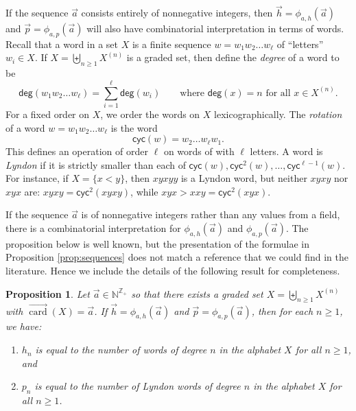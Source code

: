 \documentclass[11pt]{amsart}
\newtheorem{proposition}[theorem]{Proposition}
\theoremstyle{definition}
\numberwithin{equation}{section}
\def\NN{{\mathbb N}}
\def\ZZ{{\mathbb Z}}
\newcommand{\veccard}{\overrightarrow{\operatorname{card}}}
\begin{document}
If the sequence $\vec{a}$ consists entirely of nonnegative integers,
then $\vec{h} = \phi_{a, h}(\vec{a})$ and $\vec{p} = \phi_{a, p}(\vec{a})$ will also have combinatorial interpretation in terms of words.
Recall that a word in a set $X$ is a finite sequence $w = w_{1} w_{2} \ldots w_{\ell}$ of ``letters'' $w_{i} \in X$.  
If $X = \biguplus_{n \geq 1} X^{(n)}$ is a graded set, then define the \emph{degree} of a word to be
\[
\mathsf{deg}(w_1 w_2 \ldots w_{\ell}) = \sum_{i = 1}^{\ell} \mathsf{deg}(w_{i})
\qquad\text{where $\mathsf{deg}(x) = n$ for all $x \in X^{(n)}$}.
\]
For a fixed order on $X$, we order the words on $X$ lexicographically.  
The \emph{rotation} of a word $w = w_{1} w_{2} \ldots w_{\ell}$ is the word
\[
\mathsf{cyc}(w) =  w_{2} \ldots w_{\ell} w_{1}.
\]
This defines an operation of order $\ell$ on words of with $\ell$ letters.  
A word is \emph{Lyndon} if it is strictly smaller than each of $\mathsf{cyc}(w), \mathsf{cyc}^{2}(w), \ldots, \mathsf{cyc}^{\ell-1}(w)$.  
For instance, if $X = \{x < y\}$, then $xyxyy$ is a Lyndon word, but neither $xyxy$ nor $xyx$ are: $xyxy = \mathsf{cyc}^{2}(xyxy)$, while $xyx > xxy = \mathsf{cyc}^{2}(xyx)$.

If the sequence $\vec{a}$ is of nonnegative integers rather than
any values from a field, there is a combinatorial interpretation for
$\phi_{a, h}(\vec{a})$ and $\phi_{a, p}(\vec{a})$.
The proposition below is well known, but the presentation of the
formulae in Proposition \ref{prop:sequences} does not match a reference that
we could find in the literature.  Hence we include the details of the
following result for completeness.

\begin{proposition}
\label{prop:combinatorialinterpretation}
Let $\vec{a} \in \NN^{\ZZ_+}$ so that there exists a graded set $X = \biguplus_{n \geq 1} X^{(n)}$ with $\veccard(X) = \vec{a}$.
If $\vec{h} = \phi_{a, h}(\vec{a})$ and $\vec{p} = \phi_{a, p}(\vec{a})$, then for each $n \geq 1$, we have:
\begin{enumerate}[itemsep = 0.5em]
\item $h_n$ is equal to the number of words of degree $n$ in the alphabet $X$ for all $n \ge 1$, and 

\item $p_n$ is equal to the number of Lyndon words of degree $n$ in the alphabet $X$ for all $n \ge 1$.
\end{enumerate}
\end{proposition}
\end{document}
